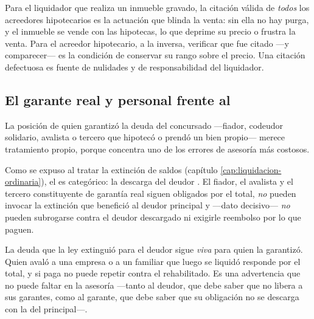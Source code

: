 \begin{practica}
Para el liquidador que realiza un inmueble gravado, la citación válida de \emph{todos} los
acreedores hipotecarios es la actuación que blinda la venta: sin ella no hay purga, y el inmueble se
vende con las hipotecas, lo que deprime su precio o frustra la venta. Para el acreedor hipotecario,
a la inversa, verificar que fue citado ---y comparecer--- es la condición de conservar su rango sobre
el precio. Una citación defectuosa es fuente de nulidades y de responsabilidad del liquidador.
\end{practica}

\bloquePractico

\subsection{El garante real y personal frente al \discharge{}}

La posición de quien garantizó la deuda del concursado ---fiador, codeudor solidario, avalista o
tercero que hipotecó o prendó un bien propio--- merece tratamiento propio, porque concentra uno de
los errores de asesoría más costosos.

Como se expuso al tratar la extinción de saldos (capítulo \ref{cap:liquidacion-ordinaria}), el
 es categórico: la descarga del deudor . El fiador, el avalista y el tercero constituyente de garantía real siguen obligados
por el total, \emph{no} pueden invocar la extinción que benefició al deudor principal y ---dato
decisivo--- \emph{no} pueden subrogarse contra el deudor descargado ni exigirle reembolso por lo que
paguen.

\begin{alerta}
La deuda que la ley extinguió para el deudor sigue \emph{viva} para quien la garantizó. Quien avaló
a una empresa o a un familiar que luego se liquidó responde por el total, y si paga no puede repetir
contra el rehabilitado. Es una advertencia que no puede faltar en la asesoría ---tanto al deudor,
que debe saber que no libera a sus garantes, como al garante, que debe saber que su obligación no se
descarga con la del principal---.
\end{alerta}

